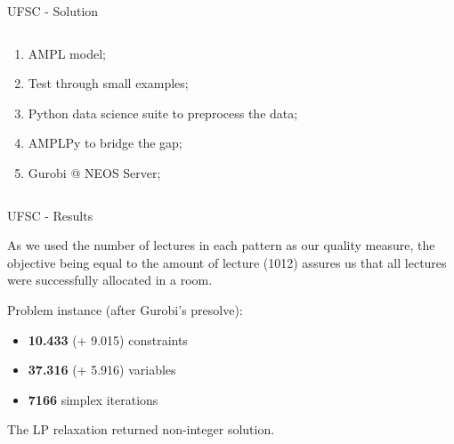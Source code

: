 \documentclass{beamer}
\begin{document}
\begin{frame}{UFSC - Solution}
    
  \begin{columns}[c]
    \begin{column}{.35\textwidth}

	\begin{enumerate}
	    \item AMPL model;
	    \item Test through small examples;
	    \item Python data science suite to preprocess the data;
	    \item AMPLPy to bridge the gap;
	    \item Gurobi @ NEOS Server;
	\end{enumerate}

    \end{column}
    \begin{column}{.65\textwidth}
	
    \end{column}
  \end{columns}
\end{frame}

\begin{frame}{UFSC - Results}

	As we used the number of lectures in each pattern as our quality measure, the objective being equal to the amount of lecture (1012) assures us that all lectures were successfully allocated in a room. \linebreak

    Problem instance (after Gurobi's presolve):
    \begin{itemize}
	\item \textbf{10.433} (+ 9.015) constraints
	\item \textbf{37.316} (+ 5.916) variables
	\item \textbf{7166} simplex iterations
    \end{itemize}
    
The LP relaxation returned non-integer solution.

\end{frame}
\end{document}
